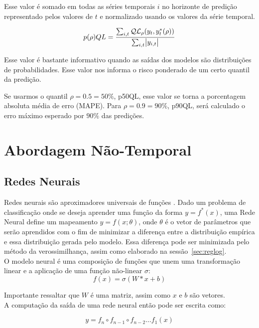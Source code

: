 Esse valor é somado em todas as séries temporais $i$ no horizonte de predição
representado pelos valores de $t$ e normalizado usando os valores da série temporal.


\[
   p(\rho)QL = \frac{\sum_{i,t}\mathcal{QL}_{\rho}(y_{t},y^{*}_{t}(\rho))}{\sum_{i,t}\abs{y_{i,t}}}
\]


Esse valor é bastante informativo quando as saídas dos modelos são distribuições
de probabilidades. Esse valor nos informa o risco ponderado de um certo quantil
da predição.

Se usarmos o quantil $\rho=0.5=50\%$, p50QL,
esse valor se torna a porcentagem absoluta média de erro (MAPE). Para
$\rho=0.9=90\%$, p90QL, será
calculado o erro máximo esperado por $90\%$ das predições.





\section{Abordagem Não-Temporal} 


\subsection{Redes Neurais}

\label{sec:nn}
Redes neurais são aproximadores universais de funções \citep{nnuni}. Dado um problema
de classificação onde se deseja aprender uma função da forma $y = f^*(x)$, uma
Rede Neural define um mapeamento $y = f(x ; \theta)$, onde $\theta$ é o vetor de
parâmetros que serão aprendidos com o fim de minimizar a diferença entre a
distribuição empírica e essa distribuição gerada pelo modelo. Essa diferença pode
ser minimizada pelo método da verossimilhança, assim como elaborado na sessão~\ref{sec:reglog}.\\

O modelo neural é uma composição de funções que unem uma transformação linear e
a aplicação de uma função não-linear $\sigma$: \\

\[ f(x)=  \sigma(W*x + b) \]

Importante ressaltar que $W$ é uma matriz, assim como $x$ e $b$ são vetores. \\

A computação da saída de uma rede neural então pode ser escrita como:

\[   y = f_n \circ f_{n-1} \circ f_{n-2} \dots f_1(x)  \]

